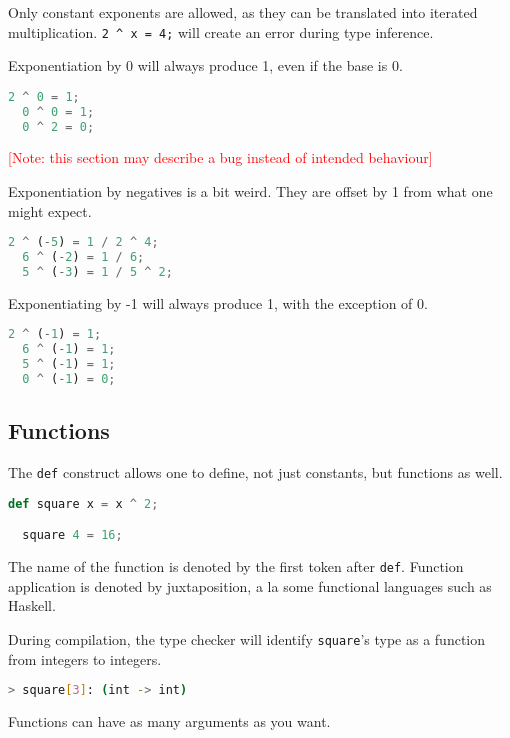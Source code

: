 Only constant exponents are allowed, as they can be translated into iterated multiplication. \lstinline{2 ^ x = 4;} will create an error during type inference.

Exponentiation by 0 will always produce 1, even if the base is 0.

\begin{lstlisting}[language=Python]
  2 ^ 0 = 1;
  0 ^ 0 = 1;
  0 ^ 2 = 0;
\end{lstlisting}

\textcolor{red}{[Note: this section may describe a bug instead of intended behaviour]}

Exponentiation by negatives is a bit weird. They are offset by 1 from what one might expect.

\begin{lstlisting}[language=Python]
  2 ^ (-5) = 1 / 2 ^ 4;
  6 ^ (-2) = 1 / 6;
  5 ^ (-3) = 1 / 5 ^ 2;
\end{lstlisting}

Exponentiating by -1 will always produce 1, with the exception of 0.

\begin{lstlisting}[language=Python]
  2 ^ (-1) = 1;
  6 ^ (-1) = 1;
  5 ^ (-1) = 1;
  0 ^ (-1) = 0;
\end{lstlisting}

\subsection{Functions}

The \lstinline{def} construct allows one to define, not just constants, but functions as well.

\begin{lstlisting}[language=Python]
  def square x = x ^ 2;

  square 4 = 16;
\end{lstlisting}

The name of the function is denoted by the first token after \lstinline{def}. Function application is denoted by juxtaposition, a la some functional languages such as Haskell.

During compilation, the type checker will identify \lstinline{square}'s type as a function from integers to integers.

\begin{lstlisting}[language=bash]
  > square[3]: (int -> int)
\end{lstlisting}

Functions can have as many arguments as you want.

